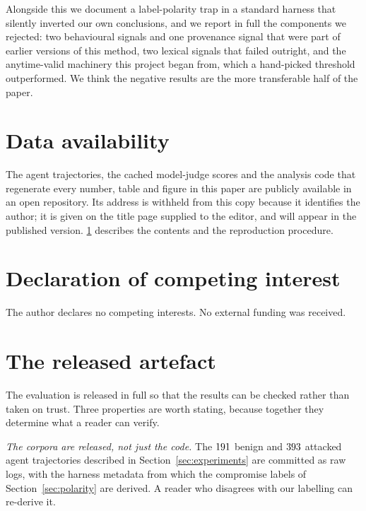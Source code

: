 \documentclass[preprint,12pt,authoryear]{elsarticle}
\theoremstyle{definition}
\begin{document}
Alongside this we document a label-polarity trap in a standard harness that
silently inverted our own conclusions, and we report in full the components we
rejected: two behavioural signals and one provenance signal that were part of
earlier versions of this method, two lexical signals that failed outright, and the
anytime-valid machinery this project began from, which a hand-picked threshold
outperformed. We think the negative results are the more
transferable half of the paper.

\section*{Data availability}

The agent trajectories, the cached model-judge scores and the analysis code that
regenerate every number, table and figure in this paper are publicly available in
an open repository. Its address is withheld from this copy because it identifies
the author; it is given on the title page supplied to the editor, and will appear
in the published version. \ref{app:artefact} describes the contents and the
reproduction procedure.

\section*{Declaration of competing interest}

The author declares no competing interests. No external funding was received.

\appendix

\section{The released artefact}\label{app:artefact}

The evaluation is released in full so that the results can be checked rather than
taken on trust. Three properties are worth stating, because together they
determine what a reader can verify.

\emph{The corpora are released, not just the code.} The $191$ benign and
$393$ attacked agent trajectories described in Section~\ref{sec:experiments}
are committed as raw logs, with the harness metadata from which the compromise
labels of Section~\ref{sec:polarity} are derived. A reader who disagrees with our
labelling can re-derive it.
\end{document}
